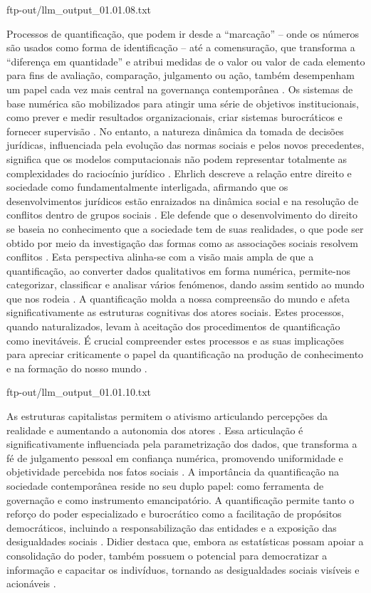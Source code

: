 ftp-out/llm_output_01.01.08.txt 

Processos de quantificação, que podem ir desde a “marcação” – onde os números são usados como forma de identificação – até a comensuração, que transforma a “diferença em quantidade” e atribui medidas de o valor ou valor de cada elemento para fins de avaliação, comparação, julgamento ou ação, também desempenham um papel cada vez mais central na governança contemporânea \cite{101111lsi12334}. Os sistemas de base numérica são mobilizados para atingir uma série de objetivos institucionais, como prever e medir resultados organizacionais, criar sistemas burocráticos e fornecer supervisão \cite{101111lsi12334}. No entanto, a natureza dinâmica da tomada de decisões jurídicas, influenciada pela evolução das normas sociais e pelos novos precedentes, significa que os modelos computacionais não podem representar totalmente as complexidades do raciocínio jurídico \cite{10.1007/s11186-021-09453-1,zabala2019decades}. Ehrlich descreve a relação entre direito e sociedade como fundamentalmente interligada, afirmando que os desenvolvimentos jurídicos estão enraizados na dinâmica social e na resolução de conflitos dentro de grupos sociais \cite{ehrlich1967fundamentos}. Ele defende que o desenvolvimento do direito se baseia no conhecimento que a sociedade tem de suas realidades, o que pode ser obtido por meio da investigação das formas como as associações sociais resolvem conflitos \cite{ehrlich1967fundamentos}. Esta perspectiva alinha-se com a visão mais ampla de que a quantificação, ao converter dados qualitativos em forma numérica, permite-nos categorizar, classificar e analisar vários fenómenos, dando assim sentido ao mundo que nos rodeia \cite{10.1590/dados.2022.65.3.267,10.1080 /07329113.2015.1046739}. A quantificação molda a nossa compreensão do mundo e afeta significativamente as estruturas cognitivas dos atores sociais. Estes processos, quando naturalizados, levam à aceitação dos procedimentos de quantificação como inevitáveis. É crucial compreender estes processos e as suas implicações para apreciar criticamente o papel da quantificação na produção de conhecimento e na formação do nosso mundo \cite{101057s4159902003965}. 

ftp-out/llm_output_01.01.10.txt 

As estruturas capitalistas permitem o ativismo articulando percepções da realidade e aumentando a autonomia dos atores \cite{didier2021}. Essa articulação é significativamente influenciada pela parametrização dos dados, que transforma a fé de julgamento pessoal em confiança numérica, promovendo uniformidade e objetividade percebida nos fatos sociais \cite{vernant2006}. A importância da quantificação na sociedade contemporânea reside no seu duplo papel: como ferramenta de governação e como instrumento emancipatório. A quantificação permite tanto o reforço do poder especializado e burocrático como a facilitação de propósitos democráticos, incluindo a responsabilização das entidades e a exposição das desigualdades sociais \cite{demortain2019,didier2021,paiva2021}. Didier destaca que, embora as estatísticas possam apoiar a consolidação do poder, também possuem o potencial para democratizar a informação e capacitar os indivíduos, tornando as desigualdades sociais visíveis e acionáveis \cite{didier2021}. 


